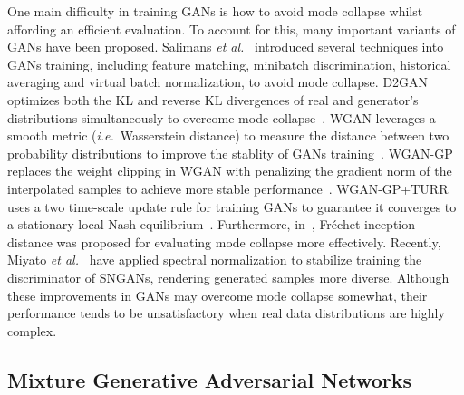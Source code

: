 \documentclass{article}
\def\etal{\emph{et al.}}
\def\ie{\emph{i.e.}}
\begin{document}
One main difficulty in training GANs is how to avoid mode collapse whilst affording an efficient evaluation.
To account for this, many important variants of GANs have been proposed.
Salimans \etal~\cite{salimans2016improved} introduced several techniques into GANs training, including feature matching, minibatch discrimination, historical averaging and virtual batch normalization, to avoid mode collapse.
D2GAN optimizes both the KL and reverse KL divergences of real and generator's distributions simultaneously to overcome mode collapse~\cite{nguyen2017dual}.
WGAN leverages a smooth metric (\ie~Wasserstein distance) to measure the distance between two probability distributions to improve the stablity of GANs training~\cite{arjovsky2015wasserstein}.
WGAN-GP replaces the weight clipping in WGAN with penalizing the gradient norm of the interpolated samples to achieve more stable performance~\cite{gulrajani2017improved}.
WGAN-GP+TURR uses a two time-scale update rule for training GANs to guarantee it converges to a stationary local Nash equilibrium~\cite{heusel2017gans}.
Furthermore, in~\cite{heusel2017gans}, Fr\'{e}chet inception distance was proposed for evaluating mode collapse more effectively.
Recently, Miyato \etal~\cite{miyato2018spectral} have applied spectral normalization to stabilize training the discriminator of SNGANs, rendering generated samples more diverse.
Although these improvements in GANs may overcome mode collapse somewhat, their performance tends to be unsatisfactory when real data distributions are highly complex.


\subsection{Mixture Generative Adversarial Networks}
\label{sec:MixGANs}
\end{document}
